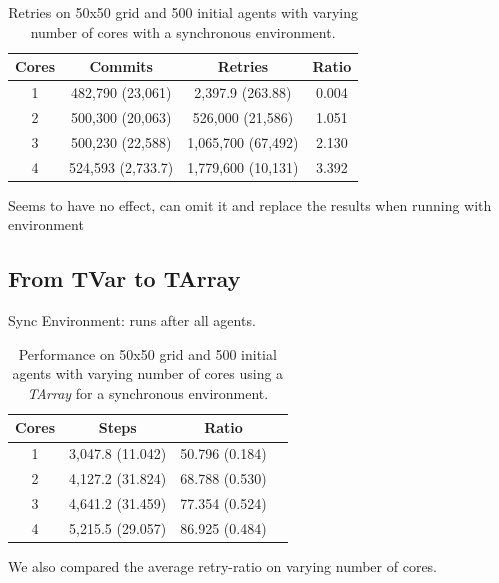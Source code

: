 \begin{table}
	\centering
  	\begin{tabular}{ c || c | c | c }
        Cores & Commits           & Retries            & Ratio \\ \hline \hline 
    	1     & 482,790 (23,061)  & 2,397.9 (263.88)   & 0.004 \\ \hline
   		2     & 500,300 (20,063)  & 526,000 (21,586)   & 1.051 \\ \hline
   		3     & 500,230 (22,588)  & 1,065,700 (67,492) & 2.130 \\ \hline
   		4     & 524,593 (2,733.7) & 1,779,600 (10,131) & 3.392 \\ \hline
   	\end{tabular}
  	
  	\caption{Retries on 50x50 grid and 500 initial agents with varying number of cores with a synchronous environment.}
	\label{tab:naive_results_syncenv_retries}
\end{table}

Seems to have no effect, can omit it and replace the results when running with environment 

\subsection{From TVar to TArray}
Sync Environment: runs after all agents.

\begin{table}
	\centering
  	\begin{tabular}{ c || c | c | c }
        Cores & Steps            & Ratio          \\ \hline \hline 
    	1     & 3,047.8 (11.042) & 50.796 (0.184) \\ \hline
   		2     & 4,127.2 (31.824) & 68.788 (0.530) \\ \hline
   		3     & 4,641.2 (31.459) & 77.354 (0.524) \\ \hline
   		4     & 5,215.5 (29.057) & 86.925 (0.484) \\ \hline \hline
   	\end{tabular}
  	
  	\caption{Performance on 50x50 grid and 500 initial agents with varying number of cores using a \textit{TArray} for a synchronous environment.}
	\label{tab:tarray_results_syncenv_time}
\end{table}

We also compared the average retry-ratio on varying number of cores.

